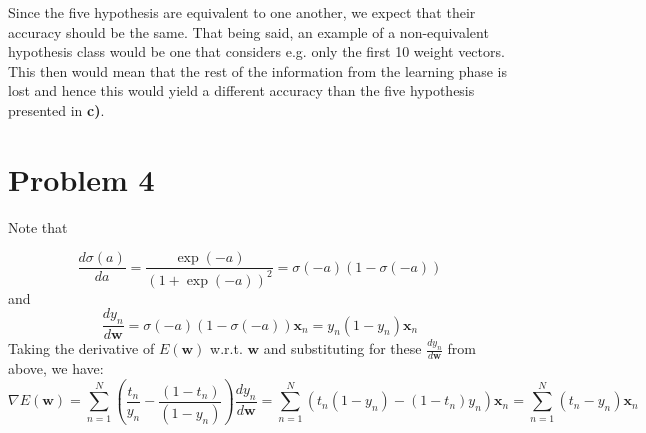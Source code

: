 \documentclass{article}
\begin{document}
Since the five hypothesis are equivalent to one another, we expect that their accuracy should be the same. That being said, an example of a non-equivalent hypothesis class would be one that considers e.g. only the first 10 weight vectors. This then would mean that the rest of the information from the learning phase is lost and hence this would yield a different accuracy than the five hypothesis presented in \textbf{c)}.
\section{Problem 4}

Note that

\begin{equation*}
\frac{d \sigma(a)}{d a} = \frac{\exp(-a)}{(1+ \exp(-a))^2} = \sigma(-a) (1-\sigma(-a))
\end{equation*}
and
\begin{equation*}
\frac{d y_n}{d \mathbf{w}} = \sigma(-a) (1-\sigma(-a)) \mathbf{x}_n = y_n (1-y_n) \mathbf{x}_n
\end{equation*}
Taking the derivative of $E(\mathbf{w})$ w.r.t. $\mathbf{w}$ and substituting for these $\frac{d y_n}{d \mathbf{w}}$ from above, we have:
\begin{equation*}
\nabla E(\mathbf{w}) = \sum_{n=1}^N (\frac{t_n}{y_n}  - \frac{(1-t_n)}{(1-y_n)}) \frac{d y_n}{d \mathbf{w}} = \sum_{n=1}^N (t_n(1-y_n)-(1-t_n)y_n) \mathbf{x}_n = \sum_{n=1}^N(t_n - y_n)\mathbf{x}_n
\end{equation*} 
\end{document}

